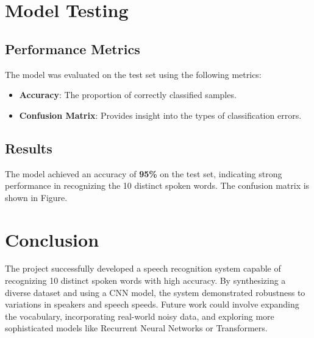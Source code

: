 \documentclass[12pt]{article}
\begin{document}


\section{Model Testing}

\subsection{Performance Metrics}

The model was evaluated on the test set using the following metrics:

\begin{itemize}
    \item \textbf{Accuracy}: The proportion of correctly classified samples.
    \item \textbf{Confusion Matrix}: Provides insight into the types of classification errors.
\end{itemize}

\subsection{Results}

The model achieved an accuracy of \textbf{95\%} on the test set, indicating strong performance in recognizing the 10 distinct spoken words. The confusion matrix is shown in Figure.

\newpage




\section{Conclusion}

The project successfully developed a speech recognition system capable of recognizing 10 distinct spoken words with high accuracy. By synthesizing a diverse dataset and using a CNN model, the system demonstrated robustness to variations in speakers and speech speeds. Future work could involve expanding the vocabulary, incorporating real-world noisy data, and exploring more sophisticated models like Recurrent Neural Networks or Transformers.
\end{document}

